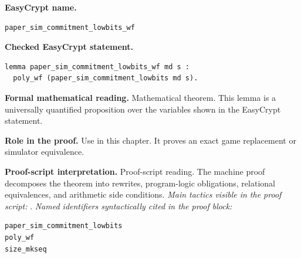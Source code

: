 \begin{formaltheorem}
\noindent\textbf{EasyCrypt name.}
\begin{lstlisting}[language=EasyCrypt,basicstyle=\ttfamily\scriptsize]
paper_sim_commitment_lowbits_wf
\end{lstlisting}
\noindent\textbf{Checked EasyCrypt statement.}
\begin{lstlisting}[language=EasyCrypt,basicstyle=\ttfamily\scriptsize]
lemma paper_sim_commitment_lowbits_wf md s :
  poly_wf (paper_sim_commitment_lowbits md s).
\end{lstlisting}
\noindent\textbf{Formal mathematical reading.}
Mathematical theorem. This lemma is a universally quantified proposition over the variables shown in the EasyCrypt statement.

\noindent\textbf{Role in the proof.}
Use in this chapter. It proves an exact game replacement or simulator equivalence.

\noindent\textbf{Proof-script interpretation.}
Proof-script reading. The machine proof decomposes the theorem into rewrites, program-logic obligations, relational equivalences, and arithmetic side conditions.
\emph{Main tactics visible in the proof script:} .
\emph{Named identifiers syntactically cited in the proof block:}
\begin{lstlisting}[language=EasyCrypt,basicstyle=\ttfamily\scriptsize]
paper_sim_commitment_lowbits
poly_wf
size_mkseq
\end{lstlisting}

\end{formaltheorem}

